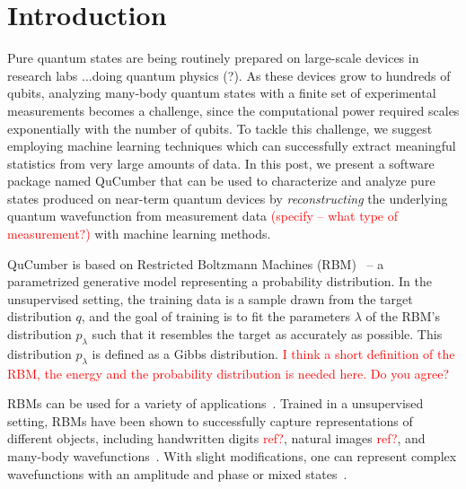 \documentclass[submission, Phys]{SciPost}
\begin{document}
\section{Introduction}

Pure quantum states are being routinely prepared on large-scale devices in research labs ...doing quantum physics (?).
As these devices grow to hundreds of qubits, 
analyzing many-body quantum states with a finite set of experimental measurements becomes a challenge,
since the computational power required scales exponentially with the number of qubits.
To tackle this challenge, we suggest employing machine learning techniques 
which can successfully extract meaningful statistics from very large amounts of data.
In this post, we present a software package named QuCumber 
that can be used to characterize and analyze pure states produced on near-term quantum devices 
by {\it reconstructing} the underlying quantum wavefunction from measurement data \textcolor{red}{(specify -- what type of measurement?)} with machine learning methods.

QuCumber is based on Restricted Boltzmann Machines (RBM)~\cite{Smolensky} -- 
a parametrized generative model representing a probability distribution. 
In the unsupervised setting, the training data is a sample drawn from the target distribution $q$, 
and the goal of training is to fit the parameters $\lambda$ of the RBM's distribution $p_\lambda$ 
such that it resembles the target as accurately as possible.
This distribution $p_\lambda$ is defined as a Gibbs distribution.
 \textcolor{red}{I think a short definition of the RBM, the energy and the probability distribution is needed here. Do you agree?}
 
RBMs can be used for a variety of applications~\cite{Hinton_2006_Science, Salakhutdinov_2007}.
Trained in a unsupervised setting, RBMs have been shown to successfully capture representations 
of different objects, including handwritten digits \textcolor{red}{ref?}, natural images \textcolor{red}{ref?}, and many-body wavefunctions~\cite{Torlai2016thermo, CarleoTroyer2017Science, ChenWang2018, GlasserCirac2018}.
With slight modifications, one can represent complex wavefunctions with an amplitude and phase or mixed states~\cite{torlai2018tomography, TorlaiPure}.
\end{document}
